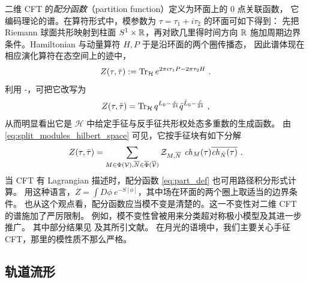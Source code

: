 
二维 CFT 的\emph{配分函数}（partition function）定义为环面上的 0 点关联函数，
它编码理论的谱。在算符形式中，模参数为 $\tau=\tau_1+i\tau_2$ 的环面可如下得到：
先把 Riemann 球面共形映射到柱面 $S^1\times\mathbb{R}$，再对欧几里得时间方向 $\mathbb{R}$
施加周期边界条件。Hamiltonian 与动量算符 $H,P$ 于是沿环面的两个圈传播态，
因此谱体现在相应演化算符在态空间上的迹中，
\begin{equation}
\label{eq:part_def}
Z(\tau,\bar {\tau}) := \operatorname{Tr}_\mathcal{H}  e^{2\pi  i \tau_1 P -2\pi\tau_2  H }
~.
\end{equation}
利用 -，可把它改写为
\begin{equation}
Z(\tau,\bar{\tau})=\operatorname{Tr}_{\mathcal{H}}q^{L_0-\frac{c}{24}}\bar{q}^{\bar{L}_0-\frac{\bar{c}}{24}}~,
\end{equation}
从而明显看出它是 $\mathcal{H}$ 中给定手征与反手征共形权处态多重数的生成函数。
由 \eqref{eq:split_modules_hilbert_space} 可见，它按手征块有如下分解
\begin{equation}
Z(\tau,\bar{\tau})=\sum_{M\in\Phi(\mathcal{V}),\overline{N}\in\overline{\Phi}(\overline{\mathcal{V}})}\mathcal{Z}_{M,\overline{N}}~{\it ch}_{M}(\tau)
\overline{ {\it ch}_{\bar N}(\tau)}~.
\end{equation}
当 CFT 有 Lagrangian 描述时，配分函数 \eqref{eq:part_def} 也可用路径积分形式计算。
用这种语言，$Z=\int D\phi~e^{-S[\phi]}$，其中场在环面的两个圈上取适当的边界条件。
也从这个观点看，配分函数应当模不变是清楚的。这一不变性对二维 CFT 的谱施加了严厉限制。
例如，模不变性曾被用来分类超对称极小模型及其进一步推广。
其中部分结果见 \cite{Cappelli:1987xt,MR1407165} 及其所引文献。
在月光的语境中，我们主要关心手征 CFT，那里的模性质不那么严格。


\subsection{轨道流形}
\label{sec:orbifolds}

